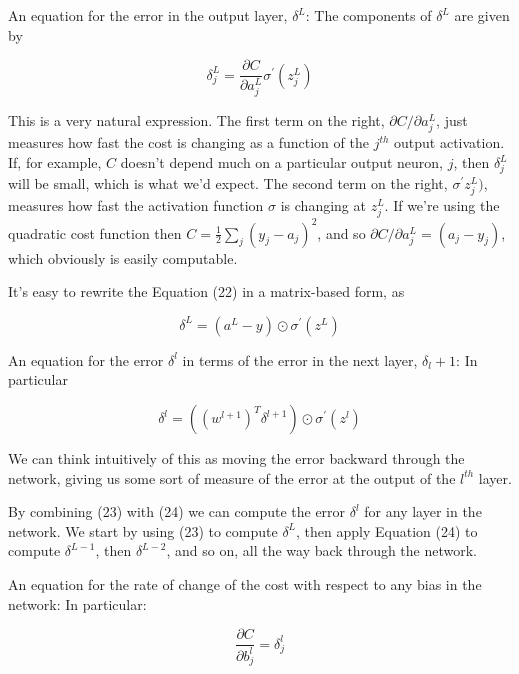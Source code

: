 \documentclass[12 pt]{article}
\begin{document}
An equation for the error in the output layer, $ \delta^L $:
The components of $ \delta^L $ are given by

\begin{equation}
    \delta^L_j = \frac {\partial C}{\partial a^L_j} \sigma^\prime
    (z^L_j)
\end{equation}

This is a very natural expression. The first term on the right,
$ \partial C / \partial a^L_j $,
just measures how fast the cost is changing as a function of the
$ j^{th} $ output activation. If, for example, $ C $ doesn't
depend much on a particular output neuron, $ j $, then $ \delta^L_j $
will be small, which is what we'd expect. The second term on the
right, $ \sigma^{\prime}z^L_j) $, measures how fast the activation function
$ \sigma $ is changing at $ z^L_j $. If we're using the quadratic cost function then
$ C = \frac{1}{2} \sum_j (y_j - a_j)^2 $, and so $ \partial C /
\partial a^L_j = (a_j - y_j) $, which obviously is easily computable.

It's easy to rewrite the Equation (22) in a matrix-based form, as

\begin{equation}
    \delta^L = (a^L - y) \odot \sigma^\prime (z^L)
\end{equation}

An equation for the error $ \delta^l $ in terms of the error in the
next layer, $ \delta_l + 1 $: In particular

\begin{equation}
    \delta^l = ((w^{l + 1})^T \delta^{l + 1}) \odot \sigma^\prime (z^l)
\end{equation}

We can think intuitively of this as moving the error backward through
the network, giving us some sort of measure of the error at the output
of the $ l^{th} $ layer.

By combining (23) with (24) we can compute the error $ \delta^l $ for
any layer in the network. We start by using (23) to compute
$ \delta^L $, then apply Equation (24) to compute $ \delta^{L - 1} $,
then $ \delta^{L - 2} $, and so on, all the way back through
the network.

An equation for the rate of change of the cost with respect to any bias
in the network: In particular:

\begin{equation}
    \frac {\partial C}{\partial b^l_j} = \delta^l_j
\end{equation}
\end{document}
